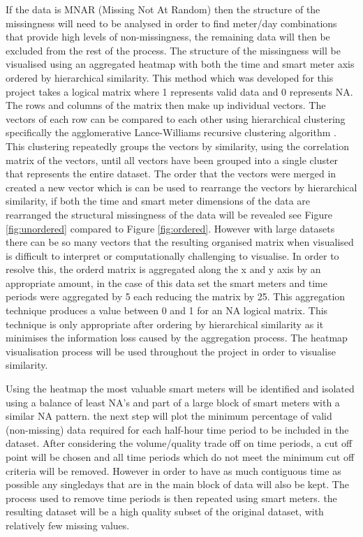 If the data is MNAR (Missing Not At Random) then the structure of the missingness will need to be analysed in order to find meter/day combinations that provide high levels of non-missingness, the remaining data will then be excluded from the rest of the process. The structure of the missingness will be visualised using an aggregated heatmap with both the time and smart meter axis ordered by hierarchical similarity. This method which was developed for this project takes a logical matrix where 1 represents valid data and 0 represents NA. The rows and columns of the matrix then make up individual vectors. The vectors of each row can be compared to each other using hierarchical clustering specifically the agglomerative Lance-Williams recursive clustering algorithm \cite{lance1967}. This clustering repeatedly groups the vectors by similarity, using the correlation matrix of the vectors, until all vectors have been grouped into a single cluster that represents the entire dataset. The order that the vectors were merged in created a new vector which is can be used to rearrange the vectors by hierarchical similarity, if both the time and smart meter dimensions of the data are rearranged the structural missingness of the data will be revealed see Figure \ref{fig:unordered} compared to Figure \ref{fig:ordered}. However with large datasets there can be so many vectors that the resulting organised matrix when visualised is difficult to interpret or computationally challenging to visualise. In order to resolve this, the orderd matrix is aggregated along the x and y axis by an appropriate amount, in the case of this data set the smart meters and time periods were aggregated by 5 each reducing the matrix by 25. This aggregation technique produces a value between 0 and 1 for an NA logical matrix. This technique is only appropriate after ordering by hierarchical similarity as it minimises the information loss caused by the aggregation process. The heatmap visualisation process will be used throughout the project in order to visualise similarity.

Using the heatmap the most valuable smart meters will be identified and isolated using a balance of least NA's and part of a large block of smart meters with a similar NA pattern. the next step will plot the minimum percentage of valid (non-missing) data required for each half-hour time period to be included in the dataset. After considering the volume/quality trade off on time periods, a cut off point will be chosen and all time periods which do not meet the minimum cut off criteria will be removed. However in order to have as much contiguous time as possible any singledays that are in the main block of data will also be kept.
The process used to remove time periods is then repeated using smart meters. the resulting dataset will be a high quality subset of the original dataset, with relatively few missing values.

